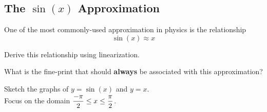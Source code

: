 
\newpage
{}
\subsection*{The $\sin(x)$ Approximation}
One of the most commonly-used approximation in physics
is the relationship
\[ \sin(x) \approx x
\]
\begin{problem}
 Derive this relationship using linearization. \vfill
\end{problem}

 What is the fine-print that should {\bf always} be associated with this approximation? \vspace{1in}

\newpage

\problem Sketch the graphs of $y = \sin(x) $ and $y = x$. \\
Focus on the domain $\displaystyle \frac{-\pi}{2} \le x \le  \frac{\pi}{2}$.

